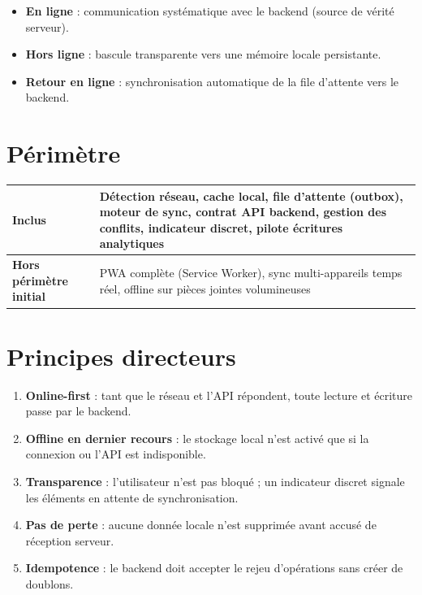 \documentclass[12pt,a4paper]{report}
\begin{document}
\begin{itemize}
  \item \textbf{En ligne} : communication systématique avec le backend (source de vérité serveur).
  \item \textbf{Hors ligne} : bascule transparente vers une mémoire locale persistante.
  \item \textbf{Retour en ligne} : synchronisation automatique de la file d'attente vers le backend.
\end{itemize}

\section{Périmètre}

\begin{longtable}{@{}p{4cm}p{9cm}@{}}
\hline
\textbf{Inclus} & Détection réseau, cache local, file d'attente (outbox), moteur de sync, contrat API backend, gestion des conflits, indicateur discret, pilote écritures analytiques \\
\hline
\textbf{Hors périmètre initial} & PWA complète (Service Worker), sync multi-appareils temps réel, offline sur pièces jointes volumineuses \\
\hline
\end{longtable}

\section{Principes directeurs}

\begin{enumerate}
  \item \textbf{Online-first} : tant que le réseau et l'API répondent, toute lecture et écriture passe par le backend.
  \item \textbf{Offline en dernier recours} : le stockage local n'est activé que si la connexion ou l'API est indisponible.
  \item \textbf{Transparence} : l'utilisateur n'est pas bloqué ; un indicateur discret signale les éléments en attente de synchronisation.
  \item \textbf{Pas de perte} : aucune donnée locale n'est supprimée avant accusé de réception serveur.
  \item \textbf{Idempotence} : le backend doit accepter le rejeu d'opérations sans créer de doublons.
\end{enumerate}

\end{document}
